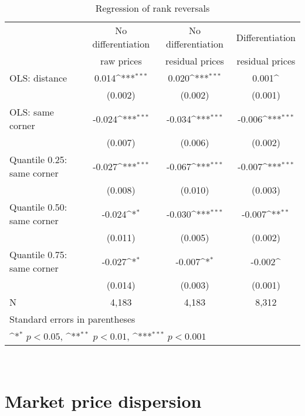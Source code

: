 \documentclass[english]{article}
\begin{document}
\begin{table}[H]
\centering
\def\sym#1{\ifmmode^{#1}\else\(^{#1}\)\fi}
\caption{Regression of rank reversals}
\begin{tabular}{lccc}
\hline
\hline
{} & No differentiation & No differentiation & Differentiation \\
{} & raw prices & residual prices & residual prices \\
\hline
OLS: distance             &  0.014\sym{***}  &  0.020\sym{***}  &  0.001\sym{}\\
{}                        & (0.002)          & (0.002)          & (0.001)   \\
OLS: same corner                & -0.024\sym{***}  & -0.034\sym{***}  & -0.006\sym{***}\\
{}                        & (0.007)          & (0.006)          & (0.002) \\
Quantile 0.25: same corner      & -0.027\sym{***}  & -0.067\sym{***}  & -0.007\sym{***}\\
{}                        & (0.008)          & (0.010)          & (0.003)  \\
Quantile 0.50: same corner      & -0.024\sym{*}    & -0.030\sym{***}  & -0.007\sym{**}\\
{}                        & (0.011)          & (0.005)          & (0.002)    \\
Quantile 0.75: same corner      & -0.027\sym{*}    & -0.007\sym{*}    & -0.002\sym{}\\
{}                        & (0.014)          & (0.003)          & (0.001)   \\
\hline
N                         & 4,183            &   4,183          &     8,312    \\
\hline\hline
\multicolumn{4}{l}{\footnotesize Standard errors in parentheses}\\
\multicolumn{4}{l}{\footnotesize \sym{*} \(p<0.05\), \sym{**} \(p<0.01\), \sym{***} \(p<0.001\)}\\
\end{tabular}
\\
\end{table}

\section{Market price dispersion}
\end{document}
